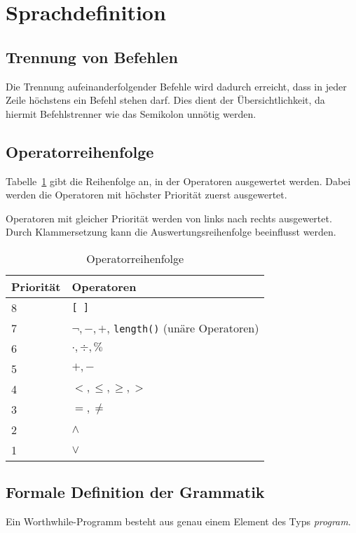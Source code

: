 \section{Sprachdefinition}

\subsection{Trennung von Befehlen}

Die Trennung aufeinanderfolgender Befehle wird dadurch erreicht, dass in jeder Zeile höchstens ein Befehl stehen darf. Dies dient der Übersichtlichkeit, da hiermit Befehlstrenner wie das Semikolon unnötig werden.

\subsection{Operatorreihenfolge}

Tabelle~\ref{operators} gibt die Reihenfolge an, in der Operatoren ausgewertet werden. Dabei werden die Operatoren mit höchster Priorität zuerst ausgewertet.

Operatoren mit gleicher Priorität werden von links nach rechts ausgewertet. Durch Klammersetzung kann die Auswertungsreihenfolge beeinflusst werden.

\begin{table}[h]
\centering
\caption{Operatorreihenfolge}
\label{operators}
\begin{tabular}{|l|l|}
\hline
\textbf{Priorität} & \textbf{Operatoren} \\
\hline
8 & \texttt{{[}\,{]}} \\
\hline
7 & $\neg, -, +$, \texttt{length()} (unäre Operatoren)\\
\hline
6 & $\cdot, \div, \%$\\
\hline
5 & $+, -$\\
\hline
4 & $<, \leq, \geq, >$\\
\hline
3 & $=, \neq$\\
\hline
2 & $\wedge$ \\
\hline
1 & $\vee$ \\
\hline
\end{tabular}
\end{table}

\subsection{Formale Definition der Grammatik}

Ein Worthwhile-Programm besteht aus genau einem Element des Typs \textit{program}.

